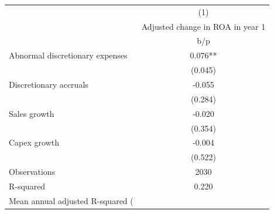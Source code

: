 {
\def\sym#1{\ifmmode^{#1}\else\(^{#1}\)\fi}
\begin{tabular}{l*{1}{c}}
\hline\hline
                    &\multicolumn{1}{c}{(1)}\\
                    &\multicolumn{1}{c}{Adjusted change in ROA in year 1}\\
                    &         b/p   \\
\hline
Abnormal discretionary expenses&       0.076** \\
                    &     (0.045)   \\
Discretionary accruals&      -0.055   \\
                    &     (0.284)   \\
Sales growth        &      -0.020   \\
                    &     (0.354)   \\
Capex growth        &      -0.004   \\
                    &     (0.522)   \\
\hline
Observations        &        2030   \\
R-squared           &       0.220   \\
Mean annual adjusted R-squared (%
\hline\hline
\end{tabular}
}
